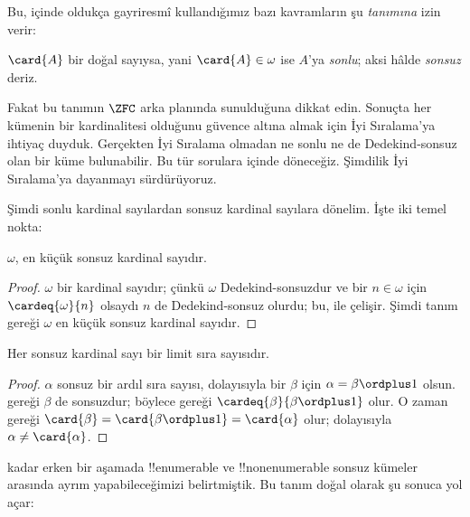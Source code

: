 \documentclass[../../../include/open-logic-section]{subfiles}
\begin{document}
Bu,  içinde oldukça gayriresmî kullandığımız bazı
kavramların şu \emph{tanımına} izin verir:

\begin{defn}
$\card{A}$ bir doğal sayıysa, yani $\card{A}\in\omega$ ise $A$'ya
\emph{sonlu}; aksi hâlde \emph{sonsuz} deriz.
\end{defn}
\noindent
Fakat bu tanımın $\ZFC$ arka planında sunulduğuna dikkat edin. Sonuçta her
kümenin bir kardinalitesi olduğunu güvence altına almak için İyi Sıralama'ya
ihtiyaç duyduk. Gerçekten İyi Sıralama olmadan ne sonlu ne de
Dedekind-sonsuz olan bir küme bulunabilir. Bu tür sorulara
 içinde döneceğiz. Şimdilik İyi Sıralama'ya
dayanmayı sürdürüyoruz.

Şimdi sonlu kardinal sayılardan sonsuz kardinal sayılara dönelim. İşte iki
temel nokta:

\begin{cor}
$\omega$, en küçük sonsuz kardinal sayıdır.
\end{cor}

\begin{proof}
$\omega$ bir kardinal sayıdır; çünkü $\omega$ Dedekind-sonsuzdur ve bir
$n\in\omega$ için $\cardeq{\omega}{n}$ olsaydı $n$ de Dedekind-sonsuz
olurdu; bu,  ile
çelişir. Şimdi tanım gereği $\omega$ en küçük sonsuz kardinal sayıdır.
\end{proof}

\begin{cor}
Her sonsuz kardinal sayı bir limit sıra sayısıdır.
\end{cor}

\begin{proof}
$\alpha$ sonsuz bir ardıl sıra sayısı, dolayısıyla bir $\beta$ için
$\alpha=\beta\ordplus1$ olsun.  gereği $\beta$
de sonsuzdur; böylece
 gereği
$\cardeq{\beta}{\beta\ordplus1}$ olur. O zaman
 gereği
$\card{\beta}=\card{\beta\ordplus1}=\card{\alpha}$ olur; dolayısıyla
$\alpha\neq\card{\alpha}$.
\end{proof}

 kadar erken bir aşamada
!!{enumerable} ve !!{nonenumerable} sonsuz kümeler arasında ayrım
yapabileceğimizi belirtmiştik. Bu tanım doğal olarak şu sonuca yol açar:
\end{document}
